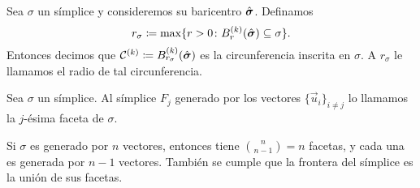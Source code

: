\begin{definition}
	Sea $\sigma$ un símplice y consideremos su baricentro $\hat{\boldsymbol{ \sigma }}$. Definamos
	\begin{equation}
		\label{eq:def:r-sigma}
		r_\sigma \coloneq \max \lbrace r > 0 \colon B_r^{(k)}(\hat{\boldsymbol{ \sigma }})
		\subseteq \sigma \rbrace.
	\end{equation}
	Entonces decimos que $\mathcal{C}^{(k)} \coloneq
	B_{r_\sigma}^{(k)}(\hat{\boldsymbol{ \sigma }})$ es la circunferencia inscrita en $\sigma$. A
	$r_\sigma$ le llamamos el radio de tal circunferencia.
\end{definition}

\begin{definition}
	Sea $\sigma$ un símplice. Al símplice $F_j$ generado por los vectores $\lbrace \vec{u}_i
	\rbrace_{i \neq j}$ lo llamamos la $j$-ésima faceta de $\sigma$.
\end{definition}
\begin{observation}
	Si $\sigma$ es generado por $n$ vectores, entonces tiene $\binom{n}{n-1} = n$ facetas, y cada
	una es generada por $n - 1$ vectores. También se cumple que la frontera del símplice es la unión
	de sus facetas.
\end{observation}

